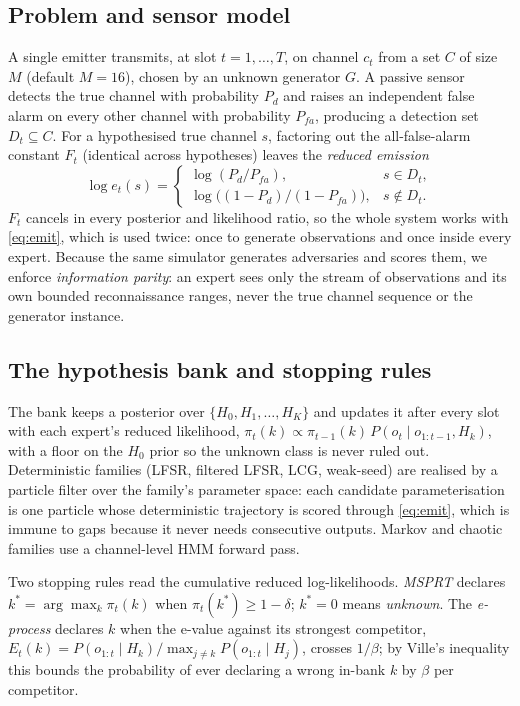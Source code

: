 \documentclass[conference]{IEEEtran}
\begin{document}
\subsection{Problem and sensor model}
A single emitter transmits, at slot $t=1,\dots,T$, on channel $c_t$ from a set
$C$ of size $M$ (default $M=16$), chosen by an unknown generator $G$. A passive
sensor detects the true channel with probability $P_d$ and raises an
independent false alarm on every other channel with probability $P_{fa}$,
producing a detection set $D_t\subseteq C$. For a hypothesised true channel $s$,
factoring out the all-false-alarm constant $F_t$ (identical across hypotheses)
leaves the \emph{reduced emission}
\begin{equation}
\log e_t(s)=
\begin{cases}
\log(P_d/P_{fa}), & s\in D_t,\\[2pt]
\log\!\big((1-P_d)/(1-P_{fa})\big), & s\notin D_t.
\end{cases}
\label{eq:emit}
\end{equation}
$F_t$ cancels in every posterior and likelihood ratio, so the whole system
works with \eqref{eq:emit}, which is used twice: once to generate observations
and once inside every expert. Because the same simulator generates adversaries
and scores them, we enforce \emph{information parity}: an expert sees only the
stream of observations and its own bounded reconnaissance ranges, never the true
channel sequence or the generator instance.

\subsection{The hypothesis bank and stopping rules}
\label{sec:bank}
The bank keeps a posterior over $\{H_0,H_1,\dots,H_K\}$ and updates it after
every slot with each expert's reduced likelihood,
$\pi_t(k)\propto\pi_{t-1}(k)\,P(o_t\mid o_{1:t-1},H_k)$, with a floor on the
$H_0$ prior so the unknown class is never ruled out. Deterministic families
(LFSR, filtered LFSR, LCG, weak-seed) are realised by a particle filter over
the family's parameter space: each candidate parameterisation is one particle
whose deterministic trajectory is scored through \eqref{eq:emit}, which is
immune to gaps because it never needs consecutive outputs. Markov and chaotic
families use a channel-level HMM forward pass.

Two stopping rules read the cumulative reduced log-likelihoods. \emph{MSPRT}
declares $k^\ast=\arg\max_k\pi_t(k)$ when $\pi_t(k^\ast)\geq1-\delta$;
$k^\ast=0$ means \emph{unknown}. The \emph{e-process} declares $k$ when the
e-value against its strongest competitor,
$E_t(k)=P(o_{1:t}\mid H_k)/\max_{j\neq k}P(o_{1:t}\mid H_j)$, crosses $1/\beta$;
by Ville's inequality this bounds the probability of ever declaring a wrong
in-bank $k$ by $\beta$ per competitor.
\end{document}
